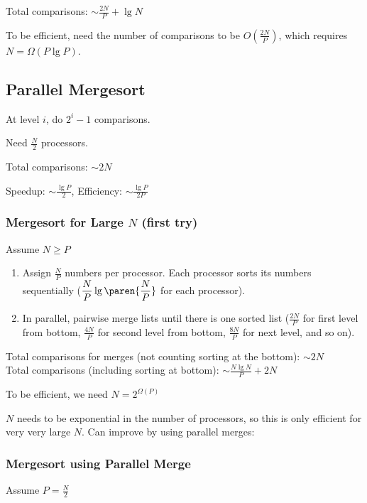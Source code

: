 Total comparisons: $\displaystyle \sim \frac{2N}{P} + \lg N$

To be efficient, need the number of comparisons to be $\displaystyle O(\frac{2N}{P})$, which requires $N = \Omega(P \lg P)$.

\subsection{Parallel Mergesort}

At level $i$, do $2^i - 1$ comparisons.

Need $\frac N 2$ processors.

Total comparisons: $\sim 2N$

Speedup: $\displaystyle \sim \frac{\lg P}{2}$, Efficiency: $\displaystyle \sim \frac{\lg P}{2P}$

\subsubsection*{Mergesort for Large $N$ (first try)}

Assume $N \geq P$

\begin{enumerate}
    \item Assign $\frac N P$ numbers per processor. Each processor sorts its numbers sequentially ($\displaystyle \frac N P \lg\paren{\frac N P}$ for each processor).
    \item In parallel, pairwise merge lists until there is one sorted list ($\frac{2N}{P}$ for first level from bottom, $\frac{4N}{P}$ for second level from bottom, $\frac{8N}{P}$ for next level, and so on).
\end{enumerate}
Total comparisons for merges (not counting sorting at the bottom): $\displaystyle \sim 2N$\\
Total comparisons (including sorting at bottom): $\displaystyle \sim \frac{N \lg N}{P} + 2N$

To be efficient, we need $\displaystyle N = 2^{\Omega(P)}$

$N$ needs to be exponential in the number of processors, so this is only efficient for very very large $N$. Can improve by using parallel merges:

\subsubsection*{Mergesort using Parallel Merge}

Assume $P = \frac N 2$

